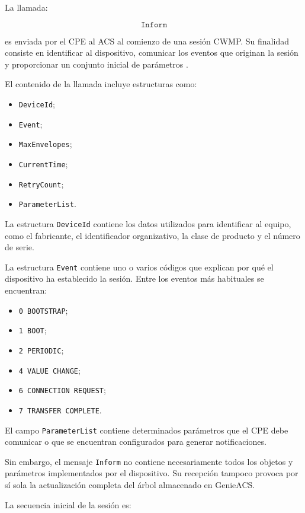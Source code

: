 La llamada:

\[
    \texttt{Inform}
\]

es enviada por el CPE al ACS al comienzo de una sesión CWMP. Su finalidad
consiste en identificar al dispositivo, comunicar los eventos que
originan la sesión y proporcionar un conjunto inicial de parámetros
\cite{bbf_tr069}.

El contenido de la llamada incluye estructuras como:

\begin{itemize}
    \item \texttt{DeviceId};
    \item \texttt{Event};
    \item \texttt{MaxEnvelopes};
    \item \texttt{CurrentTime};
    \item \texttt{RetryCount};
    \item \texttt{ParameterList}.
\end{itemize}

La estructura \texttt{DeviceId} contiene los datos utilizados para
identificar al equipo, como el fabricante, el identificador organizativo,
la clase de producto y el número de serie.

La estructura \texttt{Event} contiene uno o varios códigos que explican
por qué el dispositivo ha establecido la sesión. Entre los eventos más
habituales se encuentran:

\begin{itemize}
    \item \texttt{0 BOOTSTRAP};
    \item \texttt{1 BOOT};
    \item \texttt{2 PERIODIC};
    \item \texttt{4 VALUE CHANGE};
    \item \texttt{6 CONNECTION REQUEST};
    \item \texttt{7 TRANSFER COMPLETE}.
\end{itemize}

El campo \texttt{ParameterList} contiene determinados parámetros que el
CPE debe comunicar o que se encuentran configurados para generar
notificaciones.

Sin embargo, el mensaje \texttt{Inform} no contiene necesariamente todos
los objetos y parámetros implementados por el dispositivo. Su recepción
tampoco provoca por sí sola la actualización completa del árbol
almacenado en GenieACS.

La secuencia inicial de la sesión es:

